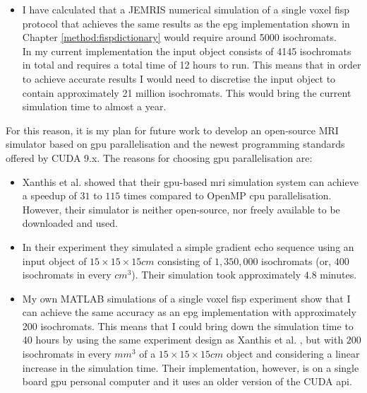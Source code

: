 \begin{enumerate}
	\begin{itemize}
	    
	    \item I have calculated that a JEMRIS numerical simulation of a single voxel \ac{fisp} protocol that achieves the same results as the \ac{epg} implementation shown in Chapter \ref{method:fispdictionary} would require around 5000 isochromats. \\
	    
	    In my current implementation the input object consists of 4145 isochromats in total and requires a total time of 12 hours to run.
	    This means that in order to achieve accurate results I would need to discretise the input object to contain approximately 21 million isochromats.
	    This would bring the current simulation time to almost a year.
	    
	\end{itemize}
	
	For this reason, it is my plan for future work to develop an open-source MRI simulator based on \ac{gpu} parallelisation and the newest programming standards offered by CUDA 9.x.
	The reasons for choosing \ac{gpu} parallelisation are:
	
	\begin{itemize}
	    
	    \item Xanthis et al. \cite{Xanthis2014} showed that their \ac{gpu}-based \ac{mri} simulation system can achieve a speedup of $31$ to $115$ times compared to OpenMP \ac{cpu} parallelisation.
	    However, their simulator is neither open-source, nor freely available to be downloaded and used.
	    
	    \item In their experiment they simulated a simple gradient echo sequence using an input object of $15 \times 15 \times 15cm$ consisting of $1, 350, 000$ isochromats (or, $400$ isochromats in every $cm^3$).
	    Their simulation took approximately $4.8$ minutes.
	    
	    \item My own MATLAB simulations of a single voxel \ac{fisp} experiment show that I can achieve the same accuracy as an \ac{epg} implementation with approximately 200 isochromats.
	    This means that I could bring down the simulation time to 40 hours by using the same experiment design as Xanthis et al. \cite{Xanthis2014}, but with $200$ isochromats in every $mm^3$ of a $15 \times 15 \times 15cm$ object and considering a linear increase in the simulation time.
	    Their implementation, however, is on a single board \ac{gpu} personal computer and it uses an older version of the CUDA \ac{api}.
	    

\end{itemize}
\end{enumerate}
